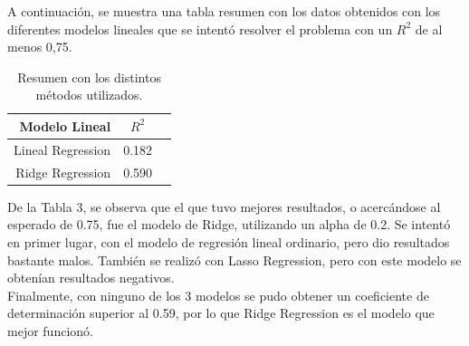 \documentclass[letter, 10pt]{article}
\begin{document}
A continuación, se muestra una tabla resumen con los datos obtenidos con los diferentes modelos lineales que se intentó resolver el problema con un $R^2$ de al menos 0,75.

\begin{table}[!hbt] 
\begin{center}
\begin{tabular}{| r | c | c |} 
\hline
\textbf{Modelo Lineal} & \textbf{$R^2$}\\ 
\hline 
Lineal Regression & 0.182\\ 
Ridge Regression & 0.590\\
\hline 
\end{tabular}
\caption{Resumen con los distintos métodos utilizados.} 
\label{table:peliculas}
\end{center} 
\end{table}

De la Tabla 3, se observa que el que tuvo mejores resultados, o acercándose al esperado de 0.75, fue el modelo de Ridge, utilizando un alpha de 0.2. Se intentó en primer lugar, con el modelo de regresión lineal ordinario, pero dio resultados bastante malos. También se realizó con Lasso Regression, pero con este modelo se obtenían resultados negativos. \\

Finalmente, con ninguno de los 3 modelos se pudo obtener un coeficiente de determinación superior al 0.59, por lo que Ridge Regression es el modelo que mejor funcionó.



\end{document}
